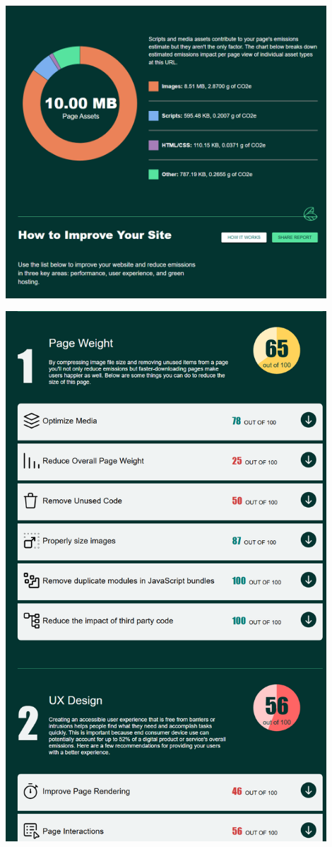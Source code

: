 \documentclass[12pt,a4paper]{report}
\begin{document}
\begin{center}
  \includegraphics[width=0.9\textwidth]{imagenes/Ecograder_3.png}
\end{center}

\begin{center}
  \includegraphics[width=0.9\textwidth]{imagenes/Ecograder_4.png}
\end{center}
\end{document}
